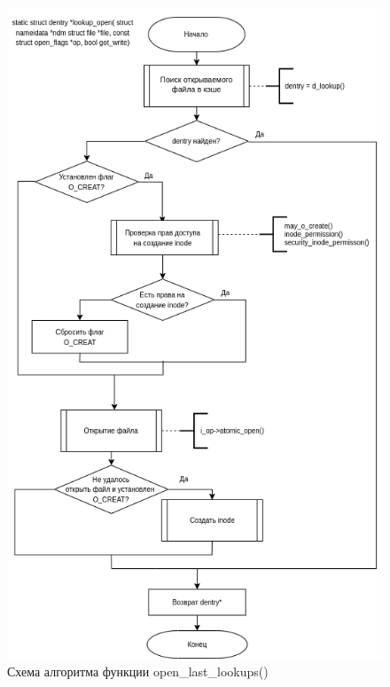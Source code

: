 \begin{figure}[H]
	\centering
	\includegraphics[scale=0.6]{assets/open-lookup_open.drawio.png}
	\caption{Схема алгоритма функции open\_last\_lookups()}
\end{figure}

